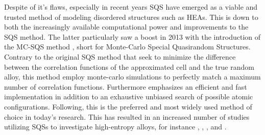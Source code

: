  
Despite of it's flaws, especially in recent years SQS have emerged as a viable and trusted method of modeling disordered structures such as HEAs. This is down to both the increasingly available computational power and improvements to the SQS method. The latter particularly saw a boost in 2013 with the introduction of the MC-SQS method \cite{mcsqs2013}, short for Monte-Carlo Special Quasirandom Structures. Contrary to the original SQS method that seek to minimize the difference between the correlation functions of the approximated cell and the true random alloy, this method employ monte-carlo simulations to perfectly match a maximum number of correlation functions. Furthermore emphasizes an efficient and fast implementation in addition to an exhaustive unbiased search of possible atomic configurations. Following, this is the preferred and most widely used method of choice in today's research. This has resulted in an increased number of studies utilizing SQSs to investigate high-entropy alloys, for instance \cite{WANG2021128754}, \cite{WEI2021167432}, \cite{RASHID2014285}, and \cite{SORKIN2021160776}.   






























































